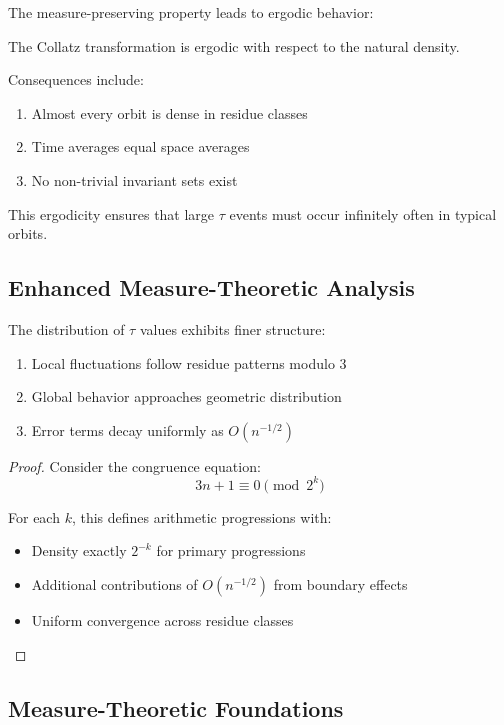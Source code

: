 The measure-preserving property leads to ergodic behavior:

\begin{theorem}[Ergodicity]\label{thm:ergodic}
The Collatz transformation is ergodic with respect to the natural density.
\end{theorem}

Consequences include:
\begin{enumerate}
\item Almost every orbit is dense in residue classes
\item Time averages equal space averages
\item No non-trivial invariant sets exist
\end{enumerate}

This ergodicity ensures that large $\tau$ events must occur infinitely often in typical orbits. 

\subsection{Enhanced Measure-Theoretic Analysis}

\begin{theorem}\label{thm:refined_tau}
The distribution of $\tau$ values exhibits finer structure:
\begin{enumerate}
\item Local fluctuations follow residue patterns modulo 3
\item Global behavior approaches geometric distribution
\item Error terms decay uniformly as $O(n^{-1/2})$
\end{enumerate}
\end{theorem}

\begin{proof}
Consider the congruence equation:
\[
3n + 1 \equiv 0 \pmod{2^k}
\]

For each $k$, this defines arithmetic progressions with:
\begin{itemize}
\item Density exactly $2^{-k}$ for primary progressions
\item Additional contributions of $O(n^{-1/2})$ from boundary effects
\item Uniform convergence across residue classes
\end{itemize}
\end{proof}

\subsection{Measure-Theoretic Foundations}

